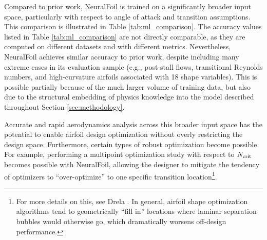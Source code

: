 \documentclass[journal]{new-aiaa}
\begin{document}
Compared to prior work, NeuralFoil is trained on a significantly broader input space, particularly with respect to angle of attack and transition assumptions. This comparison is illustrated in Table \ref{tab:ml_comparison}. The accuracy values listed in Table \ref{tab:ml_comparison} are not directly comparable, as they are computed on different datasets and with different metrics. Nevertheless, NeuralFoil achieves similar accuracy to prior work, despite including many extreme cases in its evaluation sample (e.g., post-stall flows, transitional Reynolds numbers, and high-curvature airfoils associated with 18 shape variables). This is possible partially because of the much larger volume of training data, but also due to the structural embedding of physics knowledge into the model described throughout Section \ref{sec:methodology}.

Accurate and rapid aerodynamics analysis across this broader input space has the potential to enable airfoil design optimization without overly restricting the design space. Furthermore, certain types of robust optimization become possible. For example, performing a multipoint optimization study with respect to $N_{\rm crit}$ becomes possible with NeuralFoil, allowing the designer to mitigate the tendency of optimizers to ``over-optimize'' to one specific transition location\footnote{For more details on this, see Drela \cite{drelaProsConsAirfoil1998}. In general, airfoil shape optimization algorithms tend to geometrically ``fill in'' locations where laminar separation bubbles would otherwise go, which dramatically worsens off-design performance.}.
\end{document}
